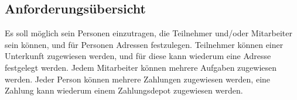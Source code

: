 \subsection{Anforderungsübersicht}
Es soll möglich sein Personen einzutragen, die Teilnehmer und/oder Mitarbeiter sein können, und für Personen Adressen festzulegen. Teilnehmer können einer Unterkunft zugewiesen werden, und für diese kann wiederum eine Adresse festgelegt werden. Jedem Mitarbeiter können mehrere Aufgaben zugewiesen werden. Jeder Person können mehrere Zahlungen zugewiesen werden, eine Zahlung kann wiederum einem Zahlungsdepot zugewiesen werden.  
